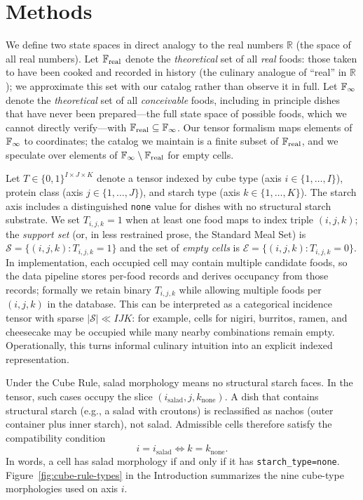 \section{Methods}

We define two state spaces in direct analogy to the real numbers $\mathbb{R}$ (the space of all real numbers).
Let $\mathbb{F}_{\mathrm{real}}$ denote the \emph{theoretical} set of all \emph{real} foods: those taken to have been cooked and recorded in history (the culinary analogue of ``real'' in $\mathbb{R}$); we approximate this set with our catalog rather than observe it in full.
Let $\mathbb{F}_{\infty}$ denote the \emph{theoretical} set of all \emph{conceivable} foods, including in principle dishes that have never been prepared---the full state space of possible foods, which we cannot directly verify---with $\mathbb{F}_{\mathrm{real}} \subseteq \mathbb{F}_{\infty}$.
Our tensor formalism maps elements of $\mathbb{F}_{\infty}$ to coordinates; the catalog we maintain is a finite subset of $\mathbb{F}_{\mathrm{real}}$, and we speculate over elements of $\mathbb{F}_{\infty} \setminus \mathbb{F}_{\mathrm{real}}$ for empty cells.

Let $T \in \{0,1\}^{I \times J \times K}$ denote a tensor indexed by cube type (axis $i \in \{1,\ldots,I\}$), protein class (axis $j \in \{1,\ldots,J\}$), and starch type (axis $k \in \{1,\ldots,K\}$).
The starch axis includes a distinguished \texttt{none} value for dishes with no structural starch substrate.
We set $T_{i,j,k}=1$ when at least one food maps to index triple $(i,j,k)$; the \emph{support set} (or, in less restrained prose, the Standard Meal Set) is $\mathcal{S} = \{(i,j,k) : T_{i,j,k}=1\}$ and the set of \emph{empty cells} is $\mathcal{E} = \{(i,j,k) : T_{i,j,k}=0\}$.
In implementation, each occupied cell may contain multiple candidate foods, so the data pipeline stores per-food records and derives occupancy from those records; formally we retain binary $T_{i,j,k}$ while allowing multiple foods per $(i,j,k)$ in the database.
This can be interpreted as a categorical incidence tensor with sparse $|\mathcal{S}| \ll IJK$: for example, cells for nigiri, burritos, ramen, and cheesecake may be occupied while many nearby combinations remain empty.
Operationally, this turns informal culinary intuition into an explicit indexed representation.


Under the Cube Rule, salad morphology means no structural starch faces.
In the tensor, such cases occupy the slice $(i_{\text{salad}}, j, k_{\text{none}})$.
A dish that contains structural starch (e.g., a salad with croutons) is reclassified as nachos (outer container plus inner starch), not salad.
Admissible cells therefore satisfy the compatibility condition
\[
  i = i_{\text{salad}} \iff k = k_{\text{none}}.
\]
In words, a cell has salad morphology if and only if it has \texttt{starch\_type=none}.
Figure~\ref{fig:cube-rule-types} in the Introduction summarizes the nine cube-type morphologies used on axis $i$.

